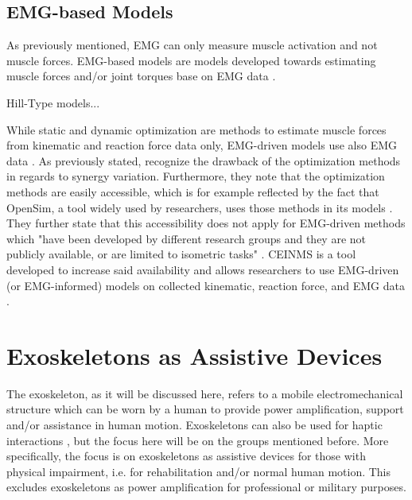 
\clearpage
\subsection{\ac{EMG}-based Models}
\label{sec:A-EMGBasedModels}
As previously mentioned, \ac{EMG} can only measure muscle activation and not muscle forces.
\ac{EMG}-based models are models developed towards estimating muscle forces and/or joint torques base on \ac{EMG} data \cite{Pizzolato2015, Erdemir2007}.

Hill-Type models... 

While static and dynamic optimization are methods to estimate muscle forces from kinematic and reaction force data only, \ac{EMG}-driven models use also \ac{EMG} data \cite{Pizzolato2015}.
As previously stated, \textcite{Pizzolato2015} recognize the drawback of the optimization methods in regards to synergy variation. 
Furthermore, they note that the optimization methods are easily accessible, which is for example reflected by the fact that OpenSim, a tool widely used by researchers, uses those methods in its models \cite{Delp2007,Pizzolato2015,Seth2018}. 
They further state that this accessibility does not apply for EMG-driven methods which "have been developed by different research groups and they are not publicly available, or are limited to isometric tasks" \parencite[1]{Pizzolato2015}.
\ac{CEINMS} is a tool developed to increase said availability and allows researchers to use \ac{EMG}-driven (or \ac{EMG}-informed) models on collected kinematic, reaction force, and \ac{EMG} data \cite{Pizzolato2015}.



\section{Exoskeletons as Assistive Devices}
\label{sec:A-Exoskeletons}
The exoskeleton, as it will be discussed here, refers to a mobile electromechanical structure which can be worn by a human to provide power amplification, support and/or assistance in human motion. Exoskeletons can also be used for haptic interactions \cite{Anam2012}, but the focus here will be on the groups mentioned before. More specifically, the focus is on exoskeletons as assistive devices for those with physical impairment, i.e. for rehabilitation and/or normal human motion. This excludes exoskeletons as power amplification for professional or military purposes.


